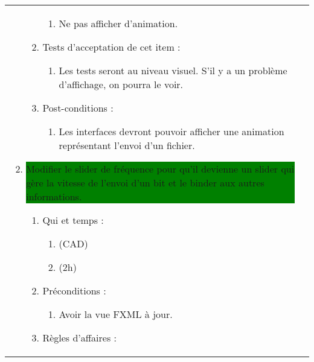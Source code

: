 \begin{longtable}{|l|p{}|}
\begin{enumerate}[label*=\arabic*.]
\begin{enumerate}[label*=\arabic*.]
\begin{enumerate}[label*=\arabic*.]
                                    \item Ne pas afficher d'animation.
                                \end{enumerate}
                                \item Tests d'acceptation de cet item :
                                \begin{enumerate}[label*=\arabic*.]
                                    \item Les tests seront au niveau visuel. S'il y a un problème d'affichage, on pourra le voir.
                                \end{enumerate}
                                \item Post-conditions :
                                \begin{enumerate}[label*=\arabic*.]
                                    \item Les interfaces devront pouvoir afficher une animation représentant l'envoi d'un fichier.
                                \end{enumerate}
                            \end{enumerate}
             \item  \colorbox{Green}{\parbox{13cm}{ Modifier le slider de fréquence pour qu'il devienne un slider qui gère la vitesse de l'envoi d'un bit et le binder aux autres informations.}}
                \begin{enumerate}[label*=\arabic*.]
                                \item Qui et temps :
                                \begin{enumerate}[label*=\arabic*.]
                                    \item (CAD)
                                    \item (2h)
                                \end{enumerate}
                                \item Préconditions :
                                \begin{enumerate}[label*=\arabic*.]
                                    \item Avoir la vue FXML à jour.
                                \end{enumerate}
                                \item Règles d'affaires :
                                \begin{enumerate}[label*=\arabic*.]

\end{enumerate}
\end{enumerate}
\end{enumerate}
\end{longtable}
